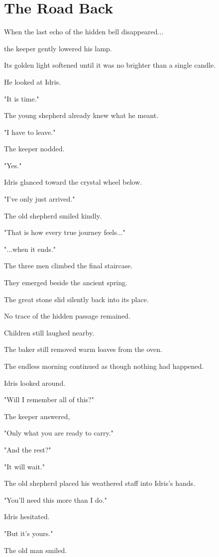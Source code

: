 \documentclass[12pt,openany]{book}
\begin{document}
\section*{The Road Back}

When the last echo of the hidden bell disappeared...

the keeper gently lowered his lamp.

Its golden light softened until it was no brighter than a single candle.

He looked at Idris.

"It is time."

The young shepherd already knew what he meant.

"I have to leave."

The keeper nodded.

"Yes."

Idris glanced toward the crystal wheel below.

"I've only just arrived."

The old shepherd smiled kindly.

"That is how every true journey feels..."

"...when it ends."

The three men climbed the final staircase.

They emerged beside the ancient spring.

The great stone slid silently back into its place.

No trace of the hidden passage remained.

Children still laughed nearby.

The baker still removed warm loaves from the oven.

The endless morning continued as though nothing had happened.

Idris looked around.

"Will I remember all of this?"

The keeper answered,

"Only what you are ready to carry."

"And the rest?"

"It will wait."

The old shepherd placed his weathered staff into Idris's hands.

"You'll need this more than I do."

Idris hesitated.

"But it's yours."

The old man smiled.
\end{document}
